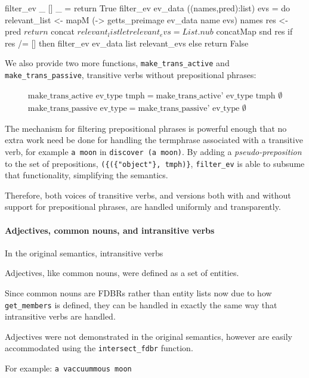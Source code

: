 \documentclass[../main.tex]{subfiles}
\begin{document}
\begin{code}
filter_ev _ [] _ = return True
filter_ev ev_data ((names,pred):list) evs = do
relevant_list <- mapM (\name -> getts_preimage ev_data name evs) names
res <- pred $ return $ concat $ relevant_list
let relevant_evs = List.nub $ concatMap snd res
if res /= [] then filter_ev ev_data list relevant_evs else return False
\end{code}

We also provide two more functions, \texttt{make\_trans\_active} and \texttt{make\_trans\_passive}, transitive verbs without prepositional phrases:

\begin{gather*}
\text{make\_trans\_active ev\_type tmph} = \text{make\_trans\_active' ev\_type tmph }\emptyset\\
\text{make\_trans\_passive ev\_type} = \text{make\_trans\_passive' ev\_type }\emptyset
\end{gather*}

The mechanism for filtering prepositional phrases is powerful enough that no extra work need be done for handling the termphrase associated with a transitive verb, for example
\texttt{a moon} in \texttt{discover (a moon)}.  By adding a {\em pseudo-preposition} to the set of prepositions, \texttt{(\{(\{"object"\}, tmph)\}}, \texttt{filter\_ev} is able to subsume that functionality, simplifying the semantics.

Therefore, both voices of transitive verbs, and versions both with and without support for prepositional phrases, are handled uniformly and transparently.

\paragraph{Adjectives, common nouns, and intransitive verbs}


In the original semantics, intransitive verbs

Adjectives, like common nouns, were defined as a set of entities.

Since common nouns are FDBRs rather than entity lists now due to how \texttt{get\_members} is defined, they can be handled in exactly
the same way that intransitive verbs are handled.

Adjectives were not demonstrated in the original semantics, however are easily accommodated using the \texttt{intersect\_fdbr} function.

For example: \texttt{a vaccuummous moon}
\end{document}
